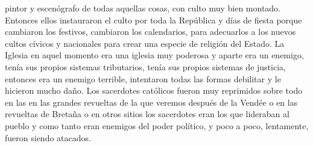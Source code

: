 pintor y escenógrafo de todas aquellas cosas, con culto muy bien montado. Entonces ellos instauraron el culto por toda la República y días de fiesta porque cambiaron los festivos, cambiaron los calendarios, para adecuarlos a los nuevos cultos cívicos y nacionales para crear una especie de religión del Estado. La Iglesia en aquel momento era una iglesia muy poderosa y aparte era un enemigo, tenía sus propios sistemas tributarios, tenía sus propios sistemas de justicia, entonces era un enemigo terrible, intentaron todas las formas debilitar y le hicieron mucho daño. Los sacerdotes católicos fueron muy reprimidos sobre todo en las en las grandes revueltas de la que veremos después de la Vendée o en las revueltas de Bretaña o en otros sitios los sacerdotes eran los que lideraban al pueblo y como tanto eran enemigos del poder político, y poco a poco, lentamente, fueron siendo atacados.

